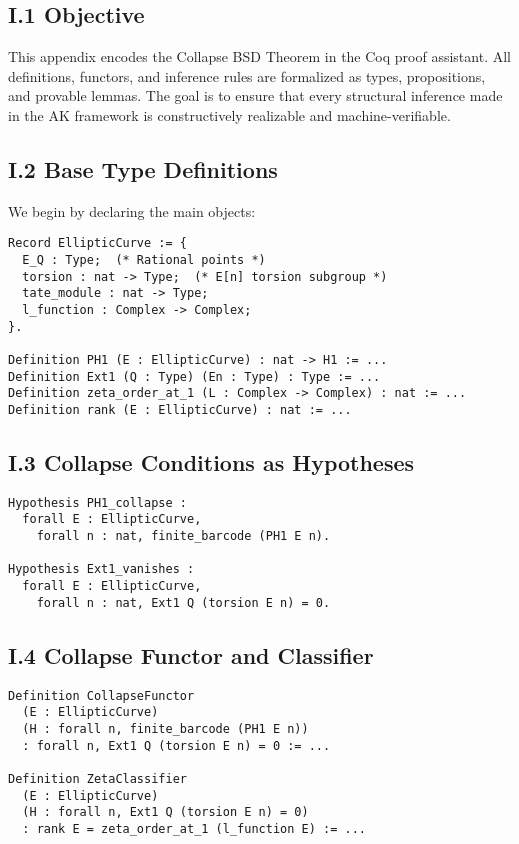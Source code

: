 \documentclass[11pt]{article}
\begin{document}
\subsection*{I.1 Objective}

This appendix encodes the Collapse BSD Theorem in the Coq proof assistant.
All definitions, functors, and inference rules are formalized as types, propositions, and provable lemmas.
The goal is to ensure that every structural inference made in the AK framework is constructively realizable and machine-verifiable.

\subsection*{I.2 Base Type Definitions}

We begin by declaring the main objects:

\begin{lstlisting}[language=Coq]
Record EllipticCurve := {
  E_Q : Type;  (* Rational points *)
  torsion : nat -> Type;  (* E[n] torsion subgroup *)
  tate_module : nat -> Type;
  l_function : Complex -> Complex;
}.

Definition PH1 (E : EllipticCurve) : nat -> H1 := ...
Definition Ext1 (Q : Type) (En : Type) : Type := ...
Definition zeta_order_at_1 (L : Complex -> Complex) : nat := ...
Definition rank (E : EllipticCurve) : nat := ...
\end{lstlisting}

\subsection*{I.3 Collapse Conditions as Hypotheses}

\begin{lstlisting}
Hypothesis PH1_collapse :
  forall E : EllipticCurve,
    forall n : nat, finite_barcode (PH1 E n).

Hypothesis Ext1_vanishes :
  forall E : EllipticCurve,
    forall n : nat, Ext1 Q (torsion E n) = 0.
\end{lstlisting}

\subsection*{I.4 Collapse Functor and Classifier}

\begin{lstlisting}
Definition CollapseFunctor
  (E : EllipticCurve)
  (H : forall n, finite_barcode (PH1 E n))
  : forall n, Ext1 Q (torsion E n) = 0 := ...

Definition ZetaClassifier
  (E : EllipticCurve)
  (H : forall n, Ext1 Q (torsion E n) = 0)
  : rank E = zeta_order_at_1 (l_function E) := ...
\end{lstlisting}
\end{document}
